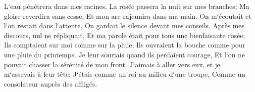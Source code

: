 \verse L`eau pénétrera dans mes racines, La rosée passera la nuit sur mes branches; 
\verse Ma gloire reverdira sans cesse, Et mon arc rajeunira dans ma main. 
\verse On m`écoutait et l`on restait dans l`attente, On gardait le silence devant mes conseils. 
\verse Après mes discours, nul ne répliquait, Et ma parole était pour tous une bienfaisante rosée; 
\verse Ils comptaient sur moi comme sur la pluie, Ils ouvraient la bouche comme pour une pluie du printemps. 
\verse Je leur souriais quand ils perdaient courage, Et l`on ne pouvait chasser la sérénité de mon front. 
\verse J`aimais à aller vers eux, et je m`asseyais à leur tête; J`étais comme un roi au milieu d`une troupe, Comme un consolateur auprès des affligés. 

